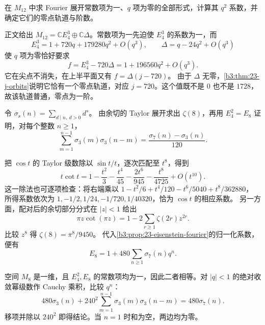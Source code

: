 \begin{exercise}\label{b3:ex:23-4}
在 \(M_{12}\) 中求 Fourier 展开常数项为一、\(q\) 项为零的全部形式，计算其 \(q^2\) 系数，并确定它们的零点轨道与阶数。
\end{exercise}
\begin{solution}
正文给出 \(M_{12}=\mathbb C E_4^3\oplus\mathbb C\Delta\)。常数项为一先迫使 \(E_4^3\) 的系数为一，而
\[
E_4^3=1+720q+179280q^2+O(q^3),\qquad
\Delta=q-24q^2+O(q^3)
\]
使 \(q\) 项为零恰好要求
\[
f=E_4^3-720\Delta
  =1+196560q^2+O(q^3).
\]
它在尖点不消失，在上半平面又有
\(f=\Delta(j-720)\)。
由于 \(\Delta\) 无零，\cref{b3:thm:23-j-orbits}说明它恰有一个零点轨道，对应 \(j=720\)。这个值既不是 \(0\) 也不是 \(1728\)，故该轨道普通，零点为一阶。
\end{solution}

\begin{exercise}\label{b3:ex:23-5}
令 \(\sigma_s(n)=\sum_{d\mid n,\ d>0}d^s\)。
由余切的 Taylor 展开求出 \(\zeta(8)\)，再用 \(E_4^2=E_8\) 证明，对每个整数 \(n\ge1\)，
\[
\sum_{m=1}^{n-1}\sigma_3(m)\sigma_3(n-m)
=\frac{\sigma_7(n)-\sigma_3(n)}{120}.
\]
\end{exercise}
\begin{solution}
把 \(\cos t\) 的 Taylor 级数除以 \(\sin t/t\)，逐次匹配至 \(t^8\)，得到
\[
t\cot t=1-\frac{t^2}{3}-\frac{t^4}{45}
-\frac{2t^6}{945}-\frac{t^8}{4725}+O(t^{10}).
\]
这一除法也可逐项检查：将右端乘以
\(1-t^2/6+t^4/120-t^6/5040+t^8/362880\)，
所得系数依次为 \(1,-1/2,1/24,-1/720,1/40320\)，恰为 \(\cos t\) 的相应系数。
另一方面，配对后的余切部分分式在 \(|z|<1\) 给出
\[
\pi z\cot(\pi z)=1-2\sum_{r\ge1}\zeta(2r)z^{2r}.
\]
比较 \(z^8\) 得 \(\zeta(8)=\pi^8/9450\)。
代入\cref{b3:prop:23-eisenstein-fourier}的归一化系数，便有
\[
E_8=1+480\sum_{n\ge1}\sigma_7(n)q^n.
\]

空间 \(M_8\) 是一维，且 \(E_4^2,E_8\) 的常数项均为一，因此二者相等。对 \(|q|<1\) 的绝对收敛幂级数作 Cauchy 乘积，比较 \(q^n\)：
\[
480\sigma_3(n)
+240^2\sum_{m=1}^{n-1}\sigma_3(m)\sigma_3(n-m)
=480\sigma_7(n).
\]
移项并除以 \(240^2\) 即得结论。当 \(n=1\) 时和为空，两边均为零。
\end{solution}

